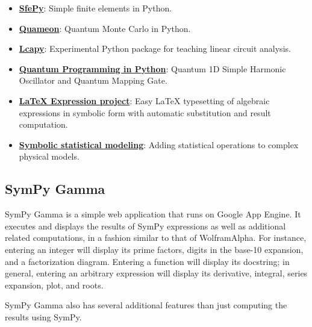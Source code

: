 \begin{itemize}
\item
  \href{http://sfepy.org/}{\textbf{SfePy}}: Simple finite elements in
  Python.
\item
  \href{http://quameon.sourceforge.net/}{\textbf{Quameon}}: Quantum
  Monte Carlo in Python.
\item
  \href{http://lcapy.elec.canterbury.ac.nz/}{\textbf{Lcapy}}:
  Experimental Python package for teaching linear circuit analysis.
\item
  \href{http://digitalcommons.calpoly.edu/cgi/viewcontent.cgi?article=1072\&context=physsp/}{\textbf{Quantum
  Programming in Python}}: Quantum 1D Simple Harmonic Oscillator and
  Quantum Mapping Gate.
\item
  \href{http://mech.fsv.cvut.cz/~stransky/software/latexexpr/doc/}{\textbf{LaTeX
  Expression project}}: Easy LaTeX typesetting of algebraic expressions
  in symbolic form with automatic substitution and result computation.
\item
  \href{https://www.researchgate.net/publication/260585491_Symbolic_Statistics_with_SymPy/}{\textbf{Symbolic
  statistical modeling}}: Adding statistical operations to complex
  physical models.
\end{itemize}

\subsection{SymPy Gamma}\label{sympy-gamma}

SymPy Gamma is a simple web application that runs on Google App Engine.
It executes and displays the results of SymPy expressions as well as
additional related computations, in a fashion similar to that of
Wolfram\textbar{}Alpha. For instance, entering an integer will display
its prime factors, digits in the base-10 expansion, and a factorization
diagram. Entering a function will display its docstring; in general,
entering an arbitrary expression will display its derivative, integral,
series expansion, plot, and roots.

SymPy Gamma also has several additional features than just computing the
results using SymPy.

